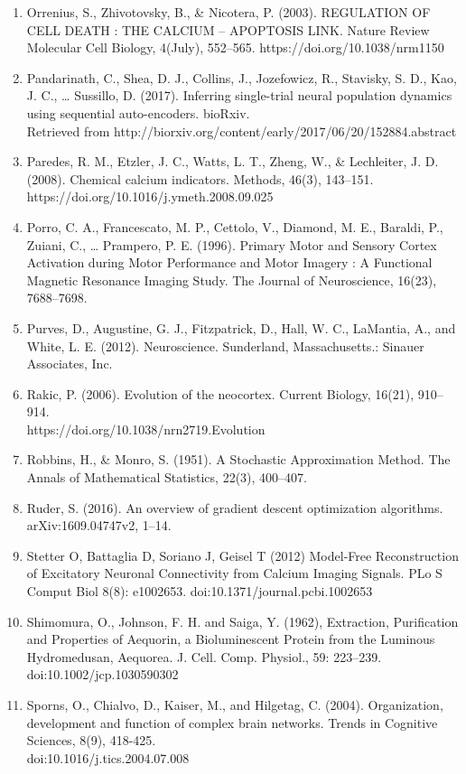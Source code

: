 \documentclass[11pt]{article}
\begin{document}
\begin{enumerate}
\item Orrenius, S., Zhivotovsky, B., \& Nicotera, P. (2003). REGULATION OF CELL DEATH : THE CALCIUM – APOPTOSIS LINK. Nature Review Molecular Cell Biology, 4(July), 552–565. https://doi.org/10.1038/nrm1150
\item Pandarinath, C., Shea, D. J., Collins, J., Jozefowicz, R., Stavisky, S. D., Kao, J. C., … Sussillo, D. (2017). Inferring single-trial neural population dynamics using sequential auto-encoders. bioRxiv.\\Retrieved from http://biorxiv.org/content/early/2017/06/20/152884.abstract
\item Paredes, R. M., Etzler, J. C., Watts, L. T., Zheng, W., \& Lechleiter, J. D. (2008). Chemical calcium indicators. Methods, 46(3), 143–151. https://doi.org/10.1016/j.ymeth.2008.09.025
\item Porro, C. A., Francescato, M. P., Cettolo, V., Diamond, M. E., Baraldi, P., Zuiani, C., … Prampero, P. E. (1996). Primary Motor and Sensory Cortex Activation during Motor Performance and Motor Imagery : A Functional Magnetic Resonance Imaging Study. The Journal of Neuroscience, 16(23), 7688–7698.
\item Purves, D., Augustine, G. J., Fitzpatrick, D., Hall, W. C., LaMantia, A., and White, L. E. (2012). Neuroscience. Sunderland, Massachusetts.: Sinauer Associates, Inc.
\item Rakic, P. (2006). Evolution of the neocortex. Current Biology, 16(21), 910–914. \\https://doi.org/10.1038/nrn2719.Evolution
\item Robbins, H., \& Monro, S. (1951). A Stochastic Approximation Method. The Annals of Mathematical Statistics, 22(3), 400–407.
\item Ruder, S. (2016). An overview of gradient descent optimization algorithms.\\ arXiv:1609.04747v2, 1–14.
\item Stetter  O,  Battaglia  D,  Soriano  J,  Geisel  T  (2012)  Model-Free  Reconstruction  of  Excitatory  Neuronal  Connectivity  from  Calcium  Imaging  Signals.  PLo S Comput  Biol  8(8):  e1002653. doi:10.1371/journal.pcbi.1002653
\item Shimomura, O., Johnson, F. H. and Saiga, Y. (1962), Extraction, Purification and Properties of Aequorin, a Bioluminescent Protein from the Luminous Hydromedusan, Aequorea. J. Cell. Comp. Physiol., 59: 223–239. doi:10.1002/jcp.1030590302
\item Sporns, O., Chialvo, D., Kaiser, M., and Hilgetag, C. (2004). Organization, development and function of complex brain networks. Trends in Cognitive Sciences, 8(9), 418-425. \\doi:10.1016/j.tics.2004.07.008

\end{enumerate}
\end{document}
